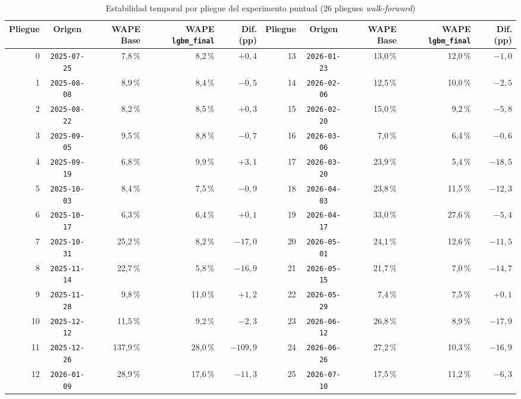 \begin{table}[t]
\caption{Estabilidad temporal por pliegue del experimento puntual (26 pliegues \textit{walk-forward})}
\label{tab:anexo_pliegues}
\centering
\scriptsize
\begin{tabularx}{\textwidth}{@{}r c r r r | r c r r r@{}}
\toprule
Pliegue & Origen & WAPE Base & WAPE \texttt{lgbm\_final} & Dif. (pp) & Pliegue & Origen & WAPE Base & WAPE \texttt{lgbm\_final} & Dif. (pp) \\
\midrule
0 & \texttt{2025-07-25} & 7,8\,\% & 8,2\,\% & $+0{,}4$ & 13 & \texttt{2026-01-23} & 13,0\,\% & 12,0\,\% & $-1{,}0$ \\
1 & \texttt{2025-08-08} & 8,9\,\% & 8,4\,\% & $-0{,}5$ & 14 & \texttt{2026-02-06} & 12,5\,\% & 10,0\,\% & $-2{,}5$ \\
2 & \texttt{2025-08-22} & 8,2\,\% & 8,5\,\% & $+0{,}3$ & 15 & \texttt{2026-02-20} & 15,0\,\% & 9,2\,\% & $-5{,}8$ \\
3 & \texttt{2025-09-05} & 9,5\,\% & 8,8\,\% & $-0{,}7$ & 16 & \texttt{2026-03-06} & 7,0\,\% & 6,4\,\% & $-0{,}6$ \\
4 & \texttt{2025-09-19} & 6,8\,\% & 9,9\,\% & $+3{,}1$ & 17 & \texttt{2026-03-20} & 23,9\,\% & 5,4\,\% & $-18{,}5$ \\
5 & \texttt{2025-10-03} & 8,4\,\% & 7,5\,\% & $-0{,}9$ & 18 & \texttt{2026-04-03} & 23,8\,\% & 11,5\,\% & $-12{,}3$ \\
6 & \texttt{2025-10-17} & 6,3\,\% & 6,4\,\% & $+0{,}1$ & 19 & \texttt{2026-04-17} & 33,0\,\% & 27,6\,\% & $-5{,}4$ \\
7 & \texttt{2025-10-31} & 25,2\,\% & 8,2\,\% & $-17{,}0$ & 20 & \texttt{2026-05-01} & 24,1\,\% & 12,6\,\% & $-11{,}5$ \\
8 & \texttt{2025-11-14} & 22,7\,\% & 5,8\,\% & $-16{,}9$ & 21 & \texttt{2026-05-15} & 21,7\,\% & 7,0\,\% & $-14{,}7$ \\
9 & \texttt{2025-11-28} & 9,8\,\% & 11,0\,\% & $+1{,}2$ & 22 & \texttt{2026-05-29} & 7,4\,\% & 7,5\,\% & $+0{,}1$ \\
10 & \texttt{2025-12-12} & 11,5\,\% & 9,2\,\% & $-2{,}3$ & 23 & \texttt{2026-06-12} & 26,8\,\% & 8,9\,\% & $-17{,}9$ \\
11 & \texttt{2025-12-26} & 137,9\,\% & 28,0\,\% & $-109{,}9$ & 24 & \texttt{2026-06-26} & 27,2\,\% & 10,3\,\% & $-16{,}9$ \\
12 & \texttt{2026-01-09} & 28,9\,\% & 17,6\,\% & $-11{,}3$ & 25 & \texttt{2026-07-10} & 17,5\,\% & 11,2\,\% & $-6{,}3$ \\
\bottomrule
\end{tabularx}
\end{table}

